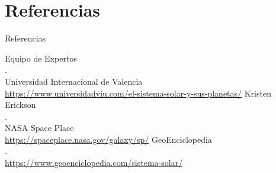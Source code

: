 \documentclass[11pt,xcolor=pdftex,dvinames,table]{beamer}
\begin{document}
    \section{Referencias}
        \begin{frame}{Referencias}
            \begin{thebibliography}{10}
            	Equipo de Expertos\\
            	.\\
            	Universidad Internacional de Valencia\\
            	\url{https://www.universidadviu.com/el-sistema-solar-y-sus-planetas/}
            	Kristen Erickson \\
            	.\\
            	NASA Space Place\\
            	\url{https://spaceplace.nasa.gov/galaxy/sp/}
            	GeoEnciclopedia \\
            	.\\
            	\url{https://www.geoenciclopedia.com/sistema-solar/}
            	
            \end{thebibliography}
    \end{frame}
\end{document}

